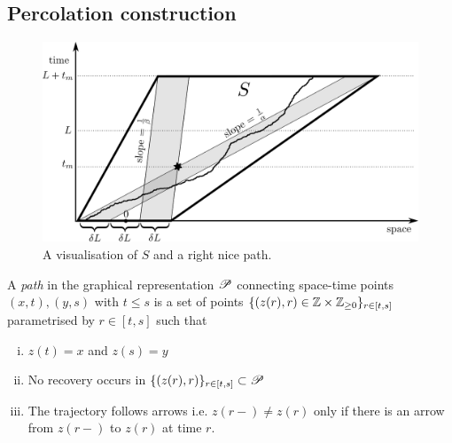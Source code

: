 \subsection{Percolation construction}

\begin{figure}[!h]
  \includegraphics[width=\linewidth]{construction_single_tile}
  \caption{A visualisation of $S$ and a right nice path. }
  \label{fig:construction_single_tile}
\end{figure}

\begin{definition}
A \textit{path} in the graphical representation $\mathscr{P}$ connecting space-time points $(x, t), (y, s)$ with $t \leq s$ is a set of points $\{(z(r), r) \in \mathbb{Z} \times \mathbb{Z}_{\geq 0} \}_{r \in [t,s]}$ parametrised by $r \in [t, s]$ such that 
\begin{enumerate}[(i)] 
\item $z(t) = x$ and $z(s) = y$
\item No recovery occurs in $\{(z(r), r)\}_{r \in [t,s]} \subset \mathscr{P}$
\item The trajectory follows arrows i.e. $z(r-) \neq z(r)$ only if there is an arrow from $z(r-)$ to $z(r)$ at time $r$.   
\end{enumerate}
\end{definition}

